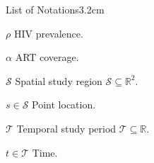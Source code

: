 \begin{mclistof}{List of Notations}{3.2cm}

\item[$\rho$] HIV prevalence.
\item[$\alpha$] ART coverage.
\item[$\mathcal{S}$] Spatial study region $\mathcal{S} \subseteq \mathbb{R}^2$.
\item[$s \in \mathcal{S}$] Point location.
\item[$\mathcal{T}$] Temporal study period $\mathcal{T} \subseteq \mathbb{R}$.
\item[$t \in \mathcal{T}$] Time. 

\end{mclistof} 